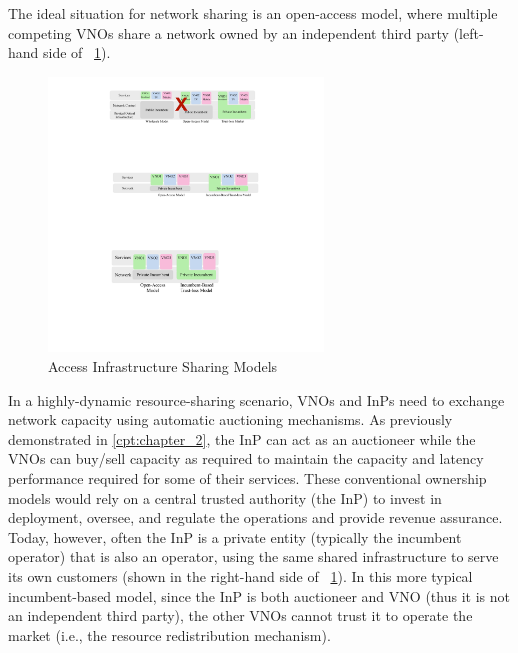 The ideal situation for network sharing is an open-access model, where multiple competing \acp{VNO} share a network owned by an independent third party (left-hand side of \figureautorefname~\ref{Fig_access}).
\begin{figure}[htbp]
  \centering
  \includegraphics[width=0.65\textwidth]{Figures/ICBC-ownership.pdf}
\caption{Access Infrastructure Sharing Models}
\label{Fig_access}
\end{figure}
In a highly-dynamic resource-sharing scenario, \acp{VNO} and \acp{InP} need to exchange network capacity using automatic auctioning mechanisms. As previously demonstrated in \autoref{cpt:chapter_2}, the \ac{InP} can act as an auctioneer while the \acp{VNO} can buy/sell capacity as required to maintain the capacity and latency performance required for some of their services. 
These conventional ownership models would rely on a central trusted authority (the \ac{InP}) to invest in deployment, oversee, and regulate the operations and provide revenue assurance. 
Today, however, often the \ac{InP} is a private entity (typically the incumbent operator) that is also an operator, using the same shared infrastructure to serve its own customers (shown in the right-hand side of \figureautorefname~\ref{Fig_access}). In this more typical incumbent-based model, since the \ac{InP} is both auctioneer and \ac{VNO} (thus it is not an independent third party), the other \acp{VNO} cannot trust it to operate the market (i.e., the resource redistribution mechanism).


